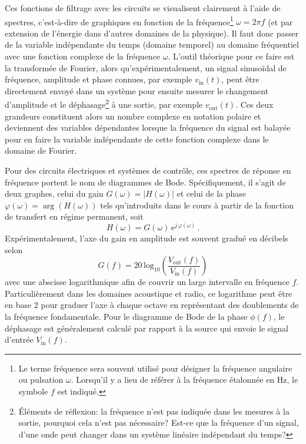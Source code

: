 \documentclass[canadien,12pt,oneside,letterpaper]{article}
\begin{document}
Ces fonctions de filtrage avec les circuits se visualisent clairement à l'aide de spectres, c'est-à-dire de graphiques en fonction de la fréquence\footnote{Le terme fréquence sera souvent utilisé pour désigner la fréquence angulaire ou pulsation $\omega$. Lorsqu'il y a lieu de référer à la fréquence étalonnée en \si{\hertz}, le symbole $f$ est indiqué.} $\omega=2\pi f$ (et par extension de l'énergie dans d'autres domaines de la physique). Il faut donc passer de la variable indépendante du temps (domaine temporel) au domaine fréquentiel avec une fonction complexe de la fréquence $\omega$. L'outil théorique pour ce faire est la transformée de Fourier, alors qu'expérimentalement, un signal sinusoïdal de fréquence, amplitude et phase connues, par exemple $v_{\mathrm{in}}(t)$, peut être directement envoyé dans un système pour ensuite mesurer le changement d'amplitude et le déphasage\footnote{Éléments de réflexion: la fréquence n'est pas indiquée dans les mesures à la sortie, pourquoi cela n'est pas nécessaire? Est-ce que la fréquence d'un signal, d'une onde peut changer dans un système linéaire indépendant du temps?} à une sortie, par exemple $v_{\mathrm{out}}(t)$. Ces deux grandeurs constituent alors un nombre complexe en notation polaire et deviennent des variables dépendantes lorsque la fréquence du signal est balayée pour en faire la variable indépendante de cette fonction complexe dans le domaine de Fourier.

Pour des circuits électriques et systèmes de contrôle, ces spectres de réponse en fréquence portent le nom de diagrammes de Bode. Spécifiquement, il s'agit de deux graphes, celui du gain $G(\omega)=\left|H\!\left(\omega\right)\right|$ et celui de la phase $\varphi(\omega)=\arg\left( H\!\left(\omega\right)\right)$ tels qu'introduits dans le cours à partir de la fonction de transfert en régime permanent, soit 
\begin{equation} \label{eq:GainPhase}
H\!\left(\omega\right)=G\!\left(\omega\right)\,\mathrm{e}^{j\,\varphi(\omega)}\, .
\end{equation}
Expérimentalement, l'axe du gain en amplitude est souvent gradué en décibels selon \[G\!\left(f\right)=20\,\textrm{log}_{10}\left(\frac{V_{\mathrm{out}}(f)}{V_{\mathrm{in}}(f)}\right)\]
avec une abscisse logarithmique afin de couvrir un large intervalle en fréquence $f$. Particulièrement dans les domaines acoustique et radio, ce logarithme peut être en base 2 pour graduer l'axe à chaque octave en représentant des doublements de la fréquence fondamentale. Pour le diagramme de Bode de la phase $\phi\!\left(f\right)$, le déphasage est généralement calculé par rapport à la source qui envoie le signal d'entrée $V_{\mathrm{in}}(f)$.
\end{document}
